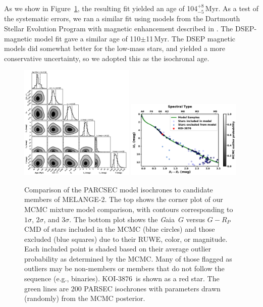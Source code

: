 \documentclass[twocolumn]{aastex631}
\newcommand{\starname}{KOI-3876}
\newcommand{\gaia}{{\textit Gaia}}
\newcommand{\association}{MELANGE-2}
\begin{document}
As we show in Figure~\ref{fig:isochrone}, the resulting fit yielded an age of 104$^{+8}_{-5}$\,Myr. As a test of the systematic errors, we ran a similar fit using models from the Dartmouth Stellar Evolution Program \citep[DSEP,][]{Dotter2008} with magnetic enhancement described in \citet{Feiden2012b}. The DSEP-magnetic model fit gave a similar age of 110$\pm$11\,Myr. The DSEP magnetic models did somewhat better for the low-mass stars, and yielded a more conservative uncertainty, so we adopted this as the isochronal age.

\begin{figure}[tb]
    \centering
    \includegraphics[width=0.49\textwidth]{cornerhybrid_parsec_bprp_g_edr3.pdf}
    \includegraphics[width=0.49\textwidth]{CMDcoloroutlierhybrid_parsec_bprp_g_edr3.pdf}
    \caption{Comparison of the PARCSEC model isochrones to candidate members of \association. The top shows the corner plot of our MCMC mixture model comparison, with contours corresponding to $1\sigma$, $2\sigma$, and $3\sigma$. The bottom plot shows the \gaia\ $G$ versus $G-R_P$ CMD of stars included in the MCMC (blue circles) and those excluded (blue squares) due to their RUWE, color, or magnitude. Each included point is shaded based on their average outlier probability as determined by the MCMC. Many of those flagged as outliers may be non-members or members that do not follow the sequence (e.g., binaries). \starname\ is shown as a red star. The green lines are 200 PARSEC isochrones with parameters drawn (randomly) from the MCMC posterior.  }
    \label{fig:isochrone}
\end{figure} 
\end{document}
